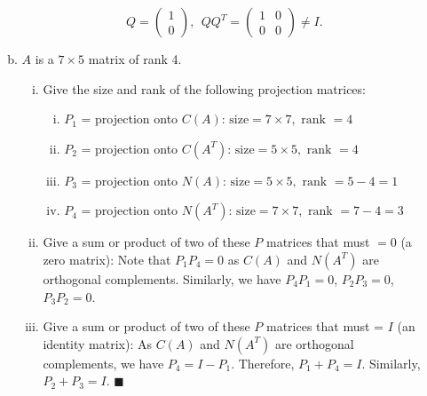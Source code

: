 \documentclass[12pt]{article}
\begin{document}
\begin{enumerate}[1.]
\begin{enumerate}[(a)]
        \[\boxed{Q = \begin{pmatrix} 1 \\ 0 \end{pmatrix}}, \ \
        QQ^T = \begin{pmatrix} 1 & 0 \\ 0 & 0 \end{pmatrix} \neq I.\]
        
        \item $A$ is a $7\times 5$ matrix of rank 4.
        \begin{enumerate}[(i)]
            \item Give the size and rank of the following projection matrices:
            \begin{enumerate}[i.]
                \item $P_1$ = projection onto $C(A)$: $\boxed{\text{size} = 7\times 7, \text{ rank } = 4}$
                \item $P_2$ = projection onto $C(A^T)$: $\boxed{\text{size} = 5\times 5, \text{ rank } = 4}$
                \item $P_3$ = projection onto $N(A)$: $\boxed{\text{size} = 5\times 5, \text{ rank } = 5-4 = 1}$
                \item $P_4$ = projection onto $N(A^T)$: $\boxed{\text{size} = 7\times 7, \text{ rank } = 7-4 = 3}$ 
            \end{enumerate}
            \item Give a sum or product of two of these $P$ matrices that must $= 0$ (a zero matrix):
            Note that $\boxed{P_1 P_4 = 0}$ as $C(A)$ and $N(A^T)$ are orthogonal complements. Similarly, we have $\boxed{P_4 P_1 = 0}$, $\boxed{P_2 P_3 = 0}$, $\boxed{P_3 P_2 = 0}$.
            \item Give a sum or product of two of these $P$ matrices that must = $I$ (an identity matrix):
            As $C(A)$ and $N(A^T)$ are orthogonal complements, we have $P_4 = I - P_1$. Therefore, $\boxed{P_1 + P_4 = I}$. Similarly, $\boxed{P_2 + P_3 = I}$.
        \hfill $\blacksquare$
        \end{enumerate}

    \end{enumerate}
   
\end{enumerate}
\end{document}
